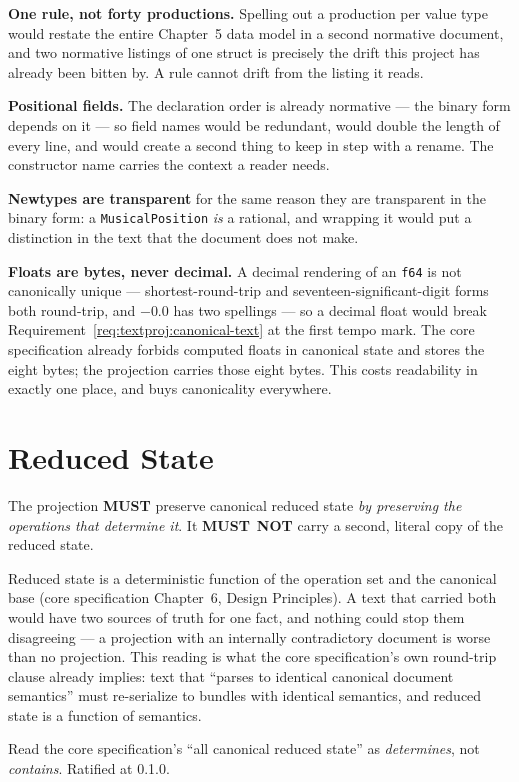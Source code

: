 \documentclass[11pt,letterpaper]{report}
\newcommand{\sectionsc}[1]{{\addfontfeatures{Letters=SmallCaps}#1}}
\newcounter{requirement}[chapter]
\newcommand{\MUST}{\textbf{MUST}}
\newcommand{\MUSTNOT}{\textbf{MUST}\nobreak\ \textbf{NOT}}
\begin{document}
\begin{rationale}
  \textbf{One rule, not forty productions.} Spelling out a production per value
  type would restate the entire Chapter~5 data model in a second normative
  document, and two normative listings of one struct is precisely the drift this
  project has already been bitten by. A rule cannot drift from the listing it
  reads.

  \textbf{Positional fields.} The declaration order is already normative --- the
  binary form depends on it --- so field names would be redundant, would double
  the length of every line, and would create a second thing to keep in step with
  a rename. The constructor name carries the context a reader needs.

  \textbf{Newtypes are transparent} for the same reason they are transparent in
  the binary form: a \texttt{MusicalPosition} \emph{is} a rational, and wrapping
  it would put a distinction in the text that the document does not make.

  \textbf{Floats are bytes, never decimal.} A decimal rendering of an
  \texttt{f64} is not canonically unique --- shortest-round-trip and
  seventeen-significant-digit forms both round-trip, and $-0.0$ has two
  spellings --- so a decimal float would break
  Requirement~\ref{req:textproj:canonical-text} at the first tempo mark. The core
  specification already forbids computed floats in canonical state and stores the
  eight bytes; the projection carries those eight bytes. This costs readability
  in exactly one place, and buys canonicality everywhere.
\end{rationale}

\section{Reduced State}

\begin{requirement}
  \label{req:textproj:reduced-state-derived}
  The projection \MUST{} preserve canonical reduced state \emph{by preserving the
  operations that determine it}. It \MUSTNOT{} carry a second, literal copy of
  the reduced state.
\end{requirement}

\begin{rationale}
  Reduced state is a deterministic function of the operation set and the
  canonical base (core specification Chapter~6, \sectionsc{Design Principles}).
  A text that carried both would have two sources of truth for one fact, and
  nothing could stop them disagreeing --- a projection with an internally
  contradictory document is worse than no projection. This reading is what the
  core specification's own round-trip clause already implies: text that ``parses
  to identical canonical document semantics'' must re-serialize to bundles with
  identical semantics, and reduced state is a function of semantics.

  Read the core specification's ``all canonical reduced state'' as
  \emph{determines}, not \emph{contains}. Ratified at 0.1.0.
\end{rationale}
\end{document}
